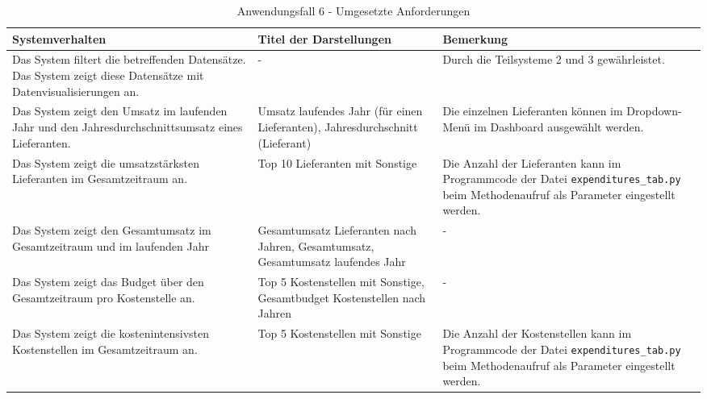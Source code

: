 \begingroup
    \setlength{\tabcolsep}{12pt} %
    \renewcommand{\arraystretch}{1.5} 
    \begin{table}[h]
        \centering
        \Large
        \begin{adjustbox}{max width=\textwidth}
        \begin{tabular}{p{}p{}p{}}
           \toprule
           Systemverhalten        &Titel der Darstellungen&Bemerkung\\
           \midrule
           Das System filtert die betreffenden Datensätze. Das System zeigt diese Datensätze mit Datenvisualisierungen an.&-&Durch die Teilsysteme 2 und 3 gewährleistet.\\
           Das System zeigt den Umsatz im laufenden Jahr und den Jahresdurchschnittsumsatz eines Lieferanten.&Umsatz laufendes Jahr (für einen Lieferanten), Jahresdurchschnitt (Lieferant)&Die einzelnen Lieferanten können im Dropdown-Menü im Dashboard ausgewählt werden.\\
           Das System zeigt die umsatzstärksten Lieferanten im Gesamtzeitraum an.&Top 10 Lieferanten mit Sonstige  &Die Anzahl der Lieferanten kann im Programmcode der Datei \texttt{expenditures\_tab.py} beim Methodenaufruf als Parameter eingestellt werden.\\
           Das System zeigt den Gesamtumsatz im Gesamtzeitraum und im laufenden Jahr&Gesamtumsatz Lieferanten nach Jahren, Gesamtumsatz, Gesamtumsatz laufendes Jahr&-\\
           Das System zeigt das Budget über den Gesamtzeitraum pro Kostenstelle an.&Top 5 Kostenstellen mit Sonstige, Gesamtbudget Kostenstellen nach Jahren&-\\
           Das System zeigt die kostenintensivsten Kostenstellen im Gesamtzeitraum an.&Top 5 Kostenstellen mit Sonstige&Die Anzahl der Kostenstellen kann im Programmcode der Datei \texttt{expenditures\_tab.py} beim Methodenaufruf als Parameter eingestellt werden.\\
        \bottomrule
        \end{tabular}
        \end{adjustbox}
        \caption{%
            Anwendungsfall 6 - Umgesetzte Anforderungen
        }
        \label{tab:Anwendungsfall 6 - Umgesetzte Anforderungen}
        \end{table}
\endgroup
\clearpage
